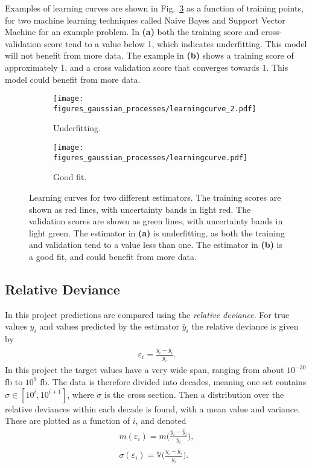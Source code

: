 \documentclass[twoside,english]{uiofysmaster}
\begin{document}
Examples of learning curves are shown in Fig.~\ref{Fig:: gaussian process : learning curves} as a function of training points, for two machine learning techniques called Naive Bayes and Support Vector Machine for an example problem. In \textbf{(a)} both the training score and cross-validation score tend to a value below 1, which indicates underfitting. This model will not benefit from more data. The example in \textbf{(b)} shows a training score of approximately 1, and a cross validation score that converges towards 1. This model could benefit from more data.

\begin{figure}
    \centering
    \begin{subfigure}[b]{0.45\textwidth}
        \texttt{[image: figures\_gaussian\_processes/learningcurve\_2.pdf]}
        \caption{Underfitting.}
        \label{fig:gull}
    \end{subfigure}
    \begin{subfigure}[b]{0.45\textwidth}
        \texttt{[image: figures\_gaussian\_processes/learningcurve.pdf]}
        \caption{Good fit.}
        \label{fig:tiger}
    \end{subfigure}
\caption{Learning curves for two different estimators. The training scores are shown as red lines, with uncertainty bands in light red. The validation scores are shown as green lines, with uncertainty bands in light green. The estimator in \textbf{(a)} is underfitting, as both the training and validation tend to a value less than one. The estimator in \textbf{(b)} is a good fit, and could benefit from more data.}
\label{Fig:: gaussian process : learning curves}
\end{figure}



\subsection{Relative Deviance}\label{Sec:: gaussian process : Relative Deviance}

In this project predictions are compared using the \textit{relative deviance}. For true values $y_i$ and values predicted by the estimator $\hat{y}_i$ the relative deviance is given by
\begin{align}\label{Eq:: gaussian process : Relative deviance}
\varepsilon_i = \frac{y_i - \hat{y}_i}{y_i}.
\end{align} 
In this project the target values have a very wide span, ranging from about $10^{-30}$ fb to $10^9$ fb. The data is therefore divided into decades, meaning one set contains $\sigma \in [10^i, 10^{i+1}]$, where $\sigma$ is the cross section. Then a distribution over the relative deviances within each decade is found, with a mean value and variance. These are plotted as a function of $i$, and denoted
\begin{align}
m(\varepsilon_i) = m \Big(\frac{y_i - \hat{y}_i}{y_i}\Big),\label{Eq:: gaussian process : rel deviance mean} \\
\sigma (\varepsilon_i) = \mathbb{V} \Big(\frac{y_i - \hat{y}_i}{y_i}\Big).\label{Eq:: gaussian process : rel deviance variance}
\end{align} 



\end{document}
